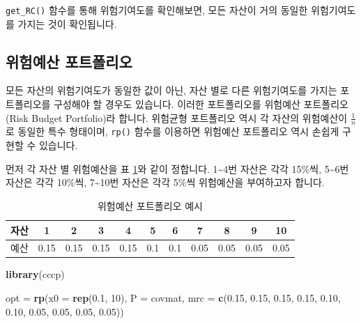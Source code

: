 \documentclass[12pt,]{book}
\newenvironment{Shaded}{\begin{snugshade}}{\end{snugshade}}
\newcommand{\DataTypeTok}[1]{\textcolor[rgb]{0.13,0.29,0.53}{#1}}
\newcommand{\DecValTok}[1]{\textcolor[rgb]{0.00,0.00,0.81}{#1}}
\newcommand{\FloatTok}[1]{\textcolor[rgb]{0.00,0.00,0.81}{#1}}
\newcommand{\KeywordTok}[1]{\textcolor[rgb]{0.13,0.29,0.53}{\textbf{#1}}}
\newcommand{\NormalTok}[1]{#1}
\newcommand{\StringTok}[1]{\textcolor[rgb]{0.31,0.60,0.02}{#1}}
\begin{document}
\texttt{get\_RC()} 함수를 통해 위험기여도를 확인해보면, 모든 자산이 거의 동일한 위험기여도를 가지는 것이 확인됩니다.

\hypertarget{section-78}{%
\subsection{위험예산 포트폴리오}\label{section-78}}

모든 자산의 위험기여도가 동일한 값이 아닌, 자산 별로 다른 위험기여도를 가지는 포트폴리오를 구성해야 할 경우도 있습니다. 이러한 포트폴리오를 위험예산 포트폴리오(Risk Budget Portfolio)라 합니다. 위험균형 포트폴리오 역시 각 자산의 위험예산이 \(\frac{1}{n}\)로 동일한 특수 형태이며, \texttt{rp()} 함수를 이용하면 위험예산 포트폴리오 역시 손쉽게 구현할 수 있습니다.

먼저 각 자산 별 위험예산을 표 \ref{tab:rb}와 같이 정합니다. 1\textasciitilde{}4번 자산은 각각 15\%씩, 5\textasciitilde{}6번 자산은 각각 10\%씩, 7\textasciitilde{}10번 자산은 각각 5\%씩 위험예산을 부여하고자 합니다.

\begin{table}[!h]

\caption{\label{tab:rb}위험예산 포트폴리오 예시}
\centering
\begin{tabular}{ccccccccccc}
\toprule
자산 & 1 & 2 & 3 & 4 & 5 & 6 & 7 & 8 & 9 & 10\\
\midrule
\rowcolor{gray!6}  예산 & 0.15 & 0.15 & 0.15 & 0.15 & 0.1 & 0.1 & 0.05 & 0.05 & 0.05 & 0.05\\
\bottomrule
\end{tabular}
\end{table}

\begin{Shaded}
\begin{Highlighting}[]
\KeywordTok{library}\NormalTok{(cccp)}

\NormalTok{opt =}\StringTok{ }\KeywordTok{rp}\NormalTok{(}\DataTypeTok{x0 =} \KeywordTok{rep}\NormalTok{(}\FloatTok{0.1}\NormalTok{, }\DecValTok{10}\NormalTok{),}
         \DataTypeTok{P =}\NormalTok{ covmat,}
         \DataTypeTok{mrc =} \KeywordTok{c}\NormalTok{(}\FloatTok{0.15}\NormalTok{, }\FloatTok{0.15}\NormalTok{, }\FloatTok{0.15}\NormalTok{, }\FloatTok{0.15}\NormalTok{, }\FloatTok{0.10}\NormalTok{,}
                 \FloatTok{0.10}\NormalTok{, }\FloatTok{0.05}\NormalTok{, }\FloatTok{0.05}\NormalTok{, }\FloatTok{0.05}\NormalTok{, }\FloatTok{0.05}\NormalTok{))}
\end{Highlighting}
\end{Shaded}
\end{document}
